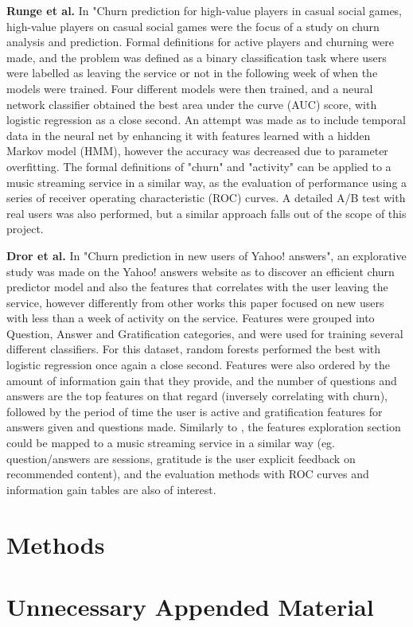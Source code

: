 \documentclass{kththesis}
\begin{document}
\textbf{Runge et al.} \citep{Runge2014} In "Churn prediction for high-value players in casual social games, high-value players on casual social games were the focus of a study on churn analysis and prediction. Formal definitions for active players and churning were made, and the problem was defined as a binary classification task where users were labelled as leaving the service or not in the following week of when the models were trained. Four different models were then trained, and a neural network classifier obtained the best area under the curve (AUC) score, with logistic regression as a close second. An attempt was made as to include temporal data in the neural net by enhancing it with features learned with a hidden Markov model (HMM), however the accuracy was decreased due to parameter overfitting. The formal definitions of "churn" and "activity" can be applied to a music streaming service in a similar way, as the evaluation of performance using a series of receiver operating characteristic (ROC) curves. A detailed A/B test with real users was also performed, but a similar approach falls out of the scope of this project.

\textbf{Dror et al.} \citep{Dror2012} In "Churn prediction in new users of Yahoo! answers", an explorative study was made on the Yahoo! answers website as to discover an efficient churn predictor model and also the features that correlates with the user leaving the service, however differently from other works this paper focused on new users with less than a week of activity on the service. Features were grouped into Question, Answer and Gratification categories, and were used for training several different classifiers. For this dataset, random forests performed the best with logistic regression once again a close second. Features were also ordered by the amount of information gain that they provide, and the number of questions and answers are the top features on that regard (inversely correlating with churn), followed by the period of time the user is active and gratification features for answers given and questions made. Similarly to \citep{Pudipeddi2014}, the features exploration section could be mapped to a music streaming service in a similar way (eg. question/answers are sessions, gratitude is the user explicit feedback on recommended content), and the evaluation methods with ROC curves and information gain tables are also of interest. 

\chapter{Methods}

\lipsum



\appendix

\chapter{Unnecessary Appended Material}
\end{document}
